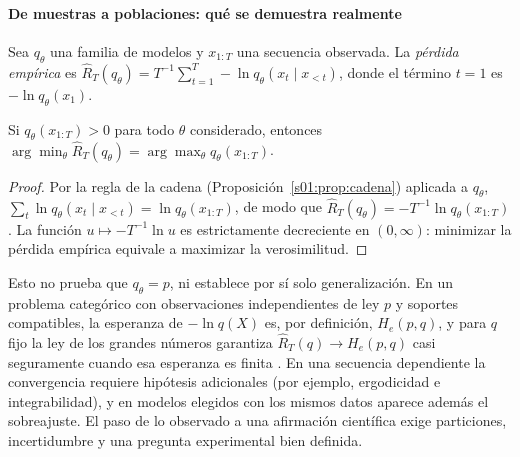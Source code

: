 \paragraph{De muestras a poblaciones: qué se demuestra realmente}
Sea $q_\theta$ una familia de modelos y $x_{1:T}$ una secuencia observada. La
\emph{pérdida empírica} es
$\widehat R_T(q_\theta)=T^{-1}\sum_{t=1}^T-\ln q_\theta(x_t\mid x_{<t})$, donde el
término $t=1$ es $-\ln q_\theta(x_1)$.
\begin{proposicion}\label{s01:prop:riesgo}
Si $q_\theta(x_{1:T})>0$ para todo $\theta$ considerado, entonces
$\arg\min_\theta\widehat R_T(q_\theta)=\arg\max_\theta q_\theta(x_{1:T})$.
\end{proposicion}
\begin{proof}
Por la regla de la cadena (Proposición~\ref{s01:prop:cadena}) aplicada a $q_\theta$,
$\sum_t\ln q_\theta(x_t\mid x_{<t})=\ln q_\theta(x_{1:T})$, de modo que
$\widehat R_T(q_\theta)=-T^{-1}\ln q_\theta(x_{1:T})$. La función
$u\mapsto-T^{-1}\ln u$ es estrictamente decreciente en $(0,\infty)$: minimizar
la pérdida empírica equivale a maximizar la verosimilitud.
\end{proof}
\noindent Esto no prueba que $q_\theta=p$, ni establece por sí solo
generalización. En un problema categórico con observaciones independientes de ley
$p$ y soportes compatibles, la esperanza de $-\ln q(X)$ es, por definición,
$H_e(p,q)$, y para $q$ fijo la ley de los grandes números garantiza
$\widehat R_T(q)\to H_e(p,q)$ casi seguramente cuando esa esperanza es finita
\citep[cap.~3]{cover2006}. En una secuencia dependiente la convergencia requiere
hipótesis adicionales (por ejemplo, ergodicidad e integrabilidad), y en modelos
elegidos con los mismos datos aparece además el sobreajuste. El paso de lo
observado a una afirmación científica exige particiones, incertidumbre y una
pregunta experimental bien definida.

